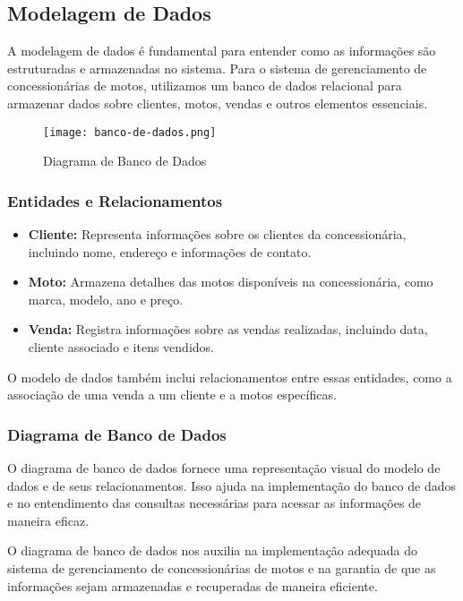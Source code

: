 \subsection{Modelagem de Dados}

A modelagem de dados é fundamental para entender como as informações são estruturadas e armazenadas no sistema. Para o sistema de gerenciamento de concessionárias de motos, utilizamos um banco de dados relacional para armazenar dados sobre clientes, motos, vendas e outros elementos essenciais. 

\begin{figure}[h]
	\centering
	\texttt{[image: banco-de-dados.png]}
	\caption{Diagrama de Banco de Dados}
	\label{fig:Diagrama de Banco de Dados}
\end{figure}

\subsubsection{Entidades e Relacionamentos}

\begin{itemize}
	\item \textbf{Cliente:} Representa informações sobre os clientes da concessionária, incluindo nome, endereço e informações de contato.
	\item \textbf{Moto:} Armazena detalhes das motos disponíveis na concessionária, como marca, modelo, ano e preço.
	\item \textbf{Venda:} Registra informações sobre as vendas realizadas, incluindo data, cliente associado e itens vendidos.
\end{itemize}

O modelo de dados também inclui relacionamentos entre essas entidades, como a associação de uma venda a um cliente e a motos específicas.

\subsubsection{Diagrama de Banco de Dados}

O diagrama de banco de dados fornece uma representação visual do modelo de dados e de seus relacionamentos. Isso ajuda na implementação do banco de dados e no entendimento das consultas necessárias para acessar as informações de maneira eficaz.

O diagrama de banco de dados nos auxilia na implementação adequada do sistema de gerenciamento de concessionárias de motos e na garantia de que as informações sejam armazenadas e recuperadas de maneira eficiente.

